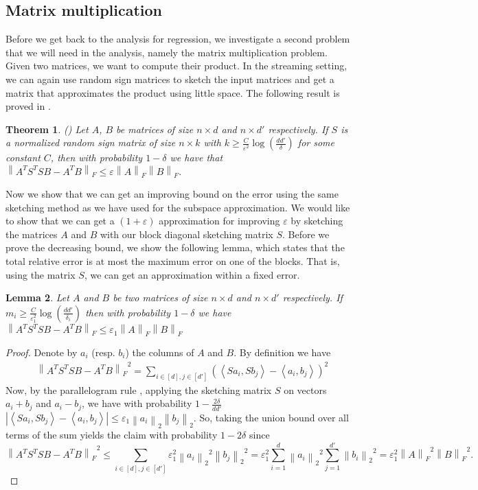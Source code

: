 \documentclass[a4paper,11pt,oneside,english,onecolumn]{article}
\newtheorem{theorem}{Theorem}
\newtheorem{lemma}[theorem]{Lemma}
\theoremstyle{definition}
\newcommand{\dotProd}[2]{\ensuremath{\left\langle #1 , #2 \right\rangle }}
\newcommand{\norm}[1]{\ensuremath{\left\| #1\right\|_2}}
\newcommand{\normF}[1]{\ensuremath{\left\| #1\right\|_F}}
\newcommand{\eps}{\ensuremath{\varepsilon}}
\begin{document}
\subsection{Matrix multiplication}
Before we get back to the analysis for regression, we investigate a second problem that we will need in the analysis, namely the matrix multiplication problem. Given two matrices, we want to compute their product. In the streaming setting, we can again use random sign matrices to sketch the input matrices and get a matrix that approximates the product using little space. The following result is proved in \cite{LinAlgStream}.
\begin{theorem}
\label{th:matrixMultiplication}(\cite{LinAlgStream})
Let $A$, $B$ be matrices of size $n \times d$ and $n \times d'$ respectively. If $S$ is a normalized random sign matrix of size $n \times k$ with $k \geq \frac{C}{\eps^2}\log(\frac{dd'}{\delta})$ for some constant $C$, then with probability $1 - \delta$ we have that $\normF{A^T S^T S B - A^T B} \leq \eps \normF{A} \normF{B}.$
\end{theorem}

Now we show that we can get an improving bound on the error using the same sketching method as we have used for the subspace approximation. We would like to show that we can get a $(1 + \eps)$ approximation for improving $\eps$ by sketching the matrices $A$ and $B$ with our block diagonal sketching matrix $S$. Before we prove the decreasing bound, we show the following lemma, which states that the total relative error is at most the maximum error on one of the blocks. That is, using the matrix $S$, we can get an approximation within a fixed error.

\begin{lemma}
\label{lemma:simpleMatrixMultiplication}
Let $A$ and $B$ be two matrices of size $n \times d $ and $n \times d'$ respectively. If $m_i \geq \frac{C}{\eps_1^2} \log(\frac{d d'}{\delta_i})$ then with probability $1 - \delta$ we have 
$
\normF{A^T S^T S B - A^T B} \leq \eps_1 \normF{A}\normF{B}
$
\end{lemma}

\begin{proof}
Denote by $a_i$ (resp. $b_i$) the columns of $A$ and $B$. By definition we have 
\begin{align*}
&\normF{A^T S^T S B - A^T B}^2 = \sum_{i \in [d], j\in [d']} (\dotProd{Sa_i}{Sb_j} - \dotProd{a_i}{b_j})^2
\end{align*}
Now, by the parallelogram rule \cite{ArriagaV06}, applying the sketching matrix $S$ on vectors $a_i + b_j$ and $a_i - b_j$, we have with probability $1 - \frac{2\delta}{dd'}$
$
|\dotProd{Sa_i}{Sb_j} - \dotProd{a_i}{b_j}| \leq \eps_1 \norm{a_i} \norm{b_j}.
$
So, taking the union bound over all terms of the sum yields the claim with probability $1 - 2 \delta$ since
$$
\normF{A^T S^T S B - A^T B}^2 \leq \sum_{i\in[d], j\in [d']} \eps_1^2 \norm{a_i}^2 \norm{b_j}^2  = \eps_1^2 \sum_{i=1}^{d}  \norm{a_i}^2  \sum_{j=1}^{d'} \norm{b_i}^2   = \eps_1^2  \normF{A}^2 \normF{B}^2.
$$
\end{proof}
\end{document}
